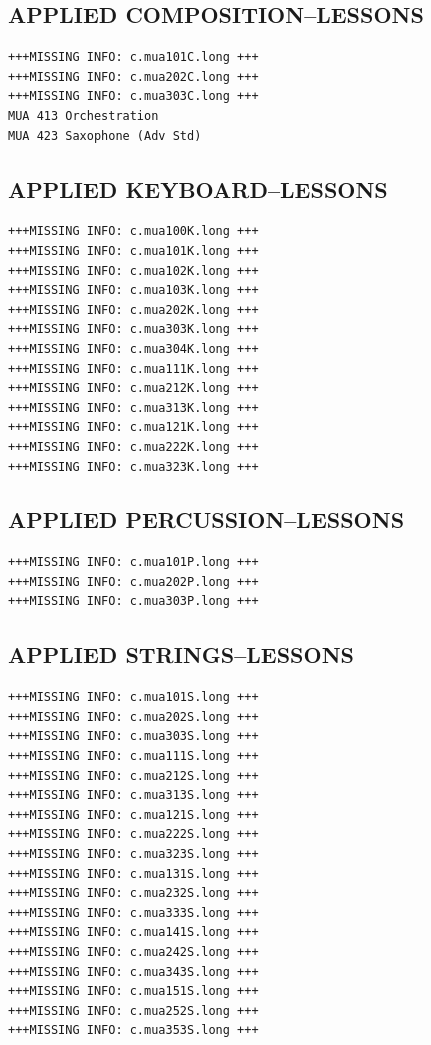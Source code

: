 \documentclass[
  letterpaper,
]{scrbook}
\begin{document}
\subsection{APPLIED
COMPOSITION--LESSONS}\label{applied-compositionlessons}

\begin{verbatim}
+++MISSING INFO: c.mua101C.long +++
+++MISSING INFO: c.mua202C.long +++
+++MISSING INFO: c.mua303C.long +++
MUA 413 Orchestration
MUA 423 Saxophone (Adv Std)
\end{verbatim}

\subsection{APPLIED KEYBOARD--LESSONS}\label{applied-keyboardlessons}

\begin{verbatim}
+++MISSING INFO: c.mua100K.long +++
+++MISSING INFO: c.mua101K.long +++
+++MISSING INFO: c.mua102K.long +++
+++MISSING INFO: c.mua103K.long +++
+++MISSING INFO: c.mua202K.long +++
+++MISSING INFO: c.mua303K.long +++
+++MISSING INFO: c.mua304K.long +++
+++MISSING INFO: c.mua111K.long +++
+++MISSING INFO: c.mua212K.long +++
+++MISSING INFO: c.mua313K.long +++
+++MISSING INFO: c.mua121K.long +++
+++MISSING INFO: c.mua222K.long +++
+++MISSING INFO: c.mua323K.long +++
\end{verbatim}

\subsection{APPLIED
PERCUSSION--LESSONS}\label{applied-percussionlessons}

\begin{verbatim}
+++MISSING INFO: c.mua101P.long +++
+++MISSING INFO: c.mua202P.long +++
+++MISSING INFO: c.mua303P.long +++
\end{verbatim}

\subsection{APPLIED STRINGS--LESSONS}\label{applied-stringslessons}

\begin{verbatim}
+++MISSING INFO: c.mua101S.long +++
+++MISSING INFO: c.mua202S.long +++
+++MISSING INFO: c.mua303S.long +++
+++MISSING INFO: c.mua111S.long +++
+++MISSING INFO: c.mua212S.long +++
+++MISSING INFO: c.mua313S.long +++
+++MISSING INFO: c.mua121S.long +++
+++MISSING INFO: c.mua222S.long +++
+++MISSING INFO: c.mua323S.long +++
+++MISSING INFO: c.mua131S.long +++
+++MISSING INFO: c.mua232S.long +++
+++MISSING INFO: c.mua333S.long +++
+++MISSING INFO: c.mua141S.long +++
+++MISSING INFO: c.mua242S.long +++
+++MISSING INFO: c.mua343S.long +++
+++MISSING INFO: c.mua151S.long +++
+++MISSING INFO: c.mua252S.long +++
+++MISSING INFO: c.mua353S.long +++
\end{verbatim}
\end{document}
